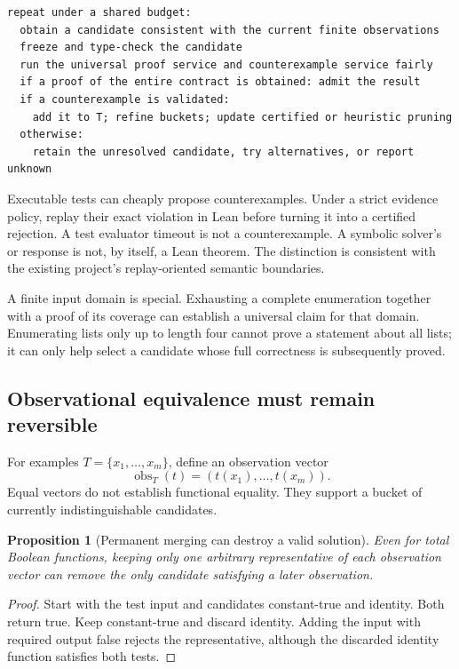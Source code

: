 \documentclass[11pt,letterpaper]{article}
\newcommand{\code}[1]{\texttt{\detokenize{#1}}}
\newtheorem{proposition}[theorem]{Proposition}
\theoremstyle{definition}\newtheorem{definition}[theorem]{Definition}
\theoremstyle{remark}\newtheorem{remark}[theorem]{Remark}
\begin{document}
\begin{lstlisting}[language={}]
repeat under a shared budget:
  obtain a candidate consistent with the current finite observations
  freeze and type-check the candidate
  run the universal proof service and counterexample service fairly
  if a proof of the entire contract is obtained: admit the result
  if a counterexample is validated:
    add it to T; refine buckets; update certified or heuristic pruning
  otherwise:
    retain the unresolved candidate, try alternatives, or report unknown
\end{lstlisting}

Executable tests can cheaply propose counterexamples. Under a strict evidence
policy, replay their exact violation in Lean before turning it into a certified
rejection. A test evaluator timeout is not a counterexample. A symbolic solver's
\code{sat} or \code{unsat} response is not, by itself, a Lean theorem.
The distinction is consistent with the existing project's replay-oriented
semantic boundaries.\cite{behavior,djexarch}

A finite input domain is special. Exhausting a complete enumeration together
with a proof of its coverage can establish a universal claim for that domain.
Enumerating lists only up to length four cannot prove a statement about all
lists; it can only help select a candidate whose full correctness is subsequently
proved.

\subsection{Observational equivalence must remain reversible}

For examples $T=\{x_1,\ldots,x_m\}$, define an observation vector
\[
 \operatorname{obs}_T(t)=(t(x_1),\ldots,t(x_m)).
\]
Equal vectors do not establish functional equality. They support a bucket of
currently indistinguishable candidates.

\begin{proposition}[Permanent merging can destroy a valid solution]
Even for total Boolean functions, keeping only one arbitrary representative of
each observation vector can remove the only candidate satisfying a later
observation.
\end{proposition}
\begin{proof}
Start with the test input \code{true} and candidates constant-true and identity.
Both return true. Keep constant-true and discard identity. Adding the input
\code{false} with required output false rejects the representative, although the
discarded identity function satisfies both tests.
\end{proof}
\end{document}
